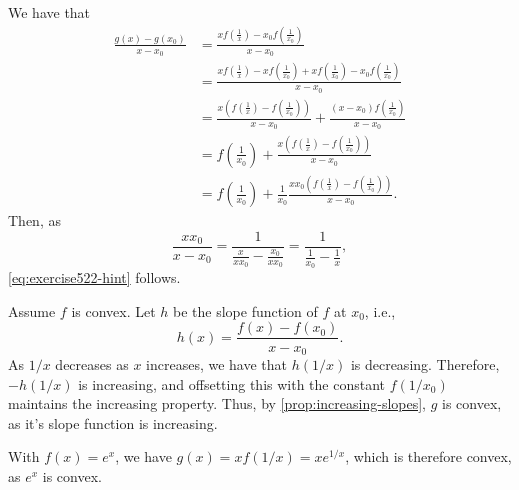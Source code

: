 \documentclass[
  a4paper,
  12pt,
]{article}
\numberwithin{equation}{section}
\begin{document}
\begin{solution}
  We have that
  \begin{align*}
    \frac{g(x) - g(x_0)}{x - x_0}
    &= \frac{x f(\frac{1}{x}) - x_0 f(\frac{1}{x_0})}{x - x_0} \\
    &= \frac{x f(\frac{1}{x}) - x f(\frac{1}{x_0}) + x f(\frac{1}{x_0}) - x_0 f(\frac{1}{x_0})}{x - x_0} \\
    &= \frac{x (f(\frac{1}{x}) - f(\frac{1}{x_0}))}{x - x_0} + \frac{(x - x_0) f(\frac{1}{x_0})}{x - x_0} \\
    &= f(\tfrac{1}{x_0}) + \frac{x (f(\frac{1}{x}) - f(\frac{1}{x_0}))}{x - x_0} \\
    &= f(\tfrac{1}{x_0}) + \frac{1}{x_0} \frac{x x_0 (f(\frac{1}{x}) - f(\frac{1}{x_0}))}{x - x_0}.
  \end{align*}
  Then, as
  \begin{equation*}
    \frac{x x_0}{x - x_0}
    = \frac{1}{\frac{x}{x x_0} - \frac{x_0}{x x_0}}
    = \frac{1}{\frac{1}{x_0} - \frac{1}{x}},
  \end{equation*}
  \cref{eq:exercise522-hint} follows.

  Assume $f$ is convex.
  Let $h$ be the slope function of $f$ at $x_0$, i.e.,
  \begin{equation}
    h(x) = \frac{f(x) - f(x_0)}{x - x_0}.
  \end{equation}
  As $1/x$ decreases as $x$ increases, we have that $h(1/x)$ is decreasing.
  Therefore, $-h(1/x)$ is increasing, and offsetting this with the constant $f(1/x_0)$ maintains the increasing property.
  Thus, by \cref{prop:increasing-slopes}, $g$ is convex, as it's slope function is increasing.

  With $f(x) = e^x$, we have $g(x) = x f(1/x) = x e^{1/x}$, which is therefore convex, as $e^x$ is convex.
\end{solution}
\end{document}
